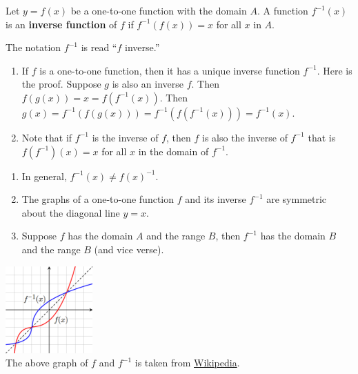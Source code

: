 \begin{definition}
  Let $y=f(x)$ be a one-to-one function with the domain $A$. A function \(f^{-1}(x)\) is an \textbf{inverse function} of \(f\) if \(f^{-1}(f(x))=x\) for all \(x\) in $A$.

The notation \(f^{-1}\) is read “\(f\) inverse.” 
\end{definition}
\begin{remark}
  \begin{enumerate}[series=PropertiesInverse]
    \item If $f$ is a one-to-one function, then it has a unique inverse function $f^{-1}$. Here is the proof. Suppose $g$ is also an inverse $f$. Then $f(g(x))=x=f(f^{-1}(x))$. Then $g(x)=f^{-1}(f(g(x)))=f^{-1}(f(f^{-1}(x)))=f^{-1}(x)$.
    \item Note that if $f^{-1}$ is the inverse of $f$, then $f$ is also the inverse of $f^{-1}$ that is $f(f^{-1})(x)=x$ for all $x$ in the domain of $f^{-1}$.
  \end{enumerate}
  \begin{multicols}{2}
    \begin{enumerate}[resume=PropertiesInverse]
      \item In general, $f^{-1}(x)\neq f(x)^{-1}$.
      \item The graphs of a one-to-one function $f$ and its inverse $f^{-1}$ are symmetric about the diagonal line $y=x$.\\
      \item Suppose $f$ has the domain $A$ and the range $B$, then $f^{-1}$ has the domain $B$ and the range $B$ (and vice verse).
      \vfill\null
    \end{enumerate}
    \columnbreak
\begin{center}
  \includegraphics[width=0.25\textwidth]{figs/Inverse_Function_Graph.png}\\
 {\footnotesize The above graph of $f$ and $f^{-1}$ is taken from \href{https://en.wikipedia.org/wiki/Inverse_function}{Wikipedia}.}
\end{center}
\end{multicols}
\end{remark}

